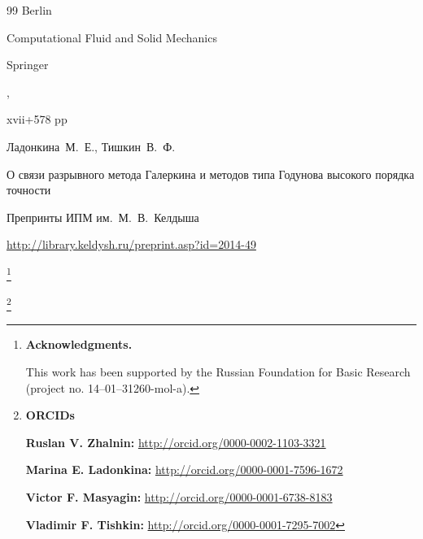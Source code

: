 \begin{thebibliography}{99}
\publaddr Berlin

\serial  Computational Fluid and Solid Mechanics

\publ Springer

,


xvii+578 pp









\by Ладонкина~М.~Е., Тишкин~В.~Ф.

\paper О связи разрывного метода Галеркина и методов типа Годунова высокого порядка точности

\jour Препринты ИПМ им.~М.~В.~Келдыша





\elink \url{http://library.keldysh.ru/preprint.asp?id=2014-49}





\end{thebibliography}



\RuDate



\newpage



\makeentitle





\thanks{\textbf{Acknowledgments.} 

This work has been supported by the Russian Foundation for Basic Research (project no. 14--01--31260-mol-a).

}









\thanks{{\bf ORCIDs}



{\bf Ruslan V. Zhalnin:}    \url{http://orcid.org/0000-0002-1103-3321}



{\bf Marina E. Ladonkina:} \url{http://orcid.org/0000-0001-7596-1672}



{\bf Victor F. Masyagin:} \url{http://orcid.org/0000-0001-6738-8183}



{\bf Vladimir F. Tishkin:} \url{http://orcid.org/0000-0001-7295-7002}





}



